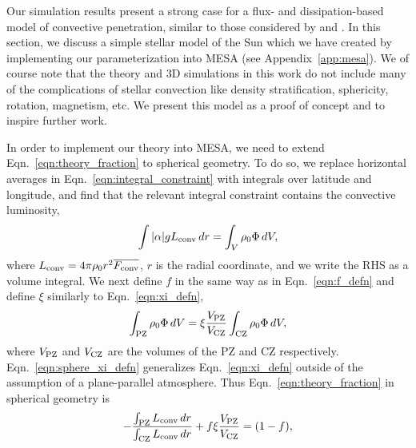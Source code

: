 \documentclass[twocolumn, linenumbers]{aastex631}
\renewcommand{\bar}[1]{\overline{#1}}
\begin{document}
Our simulation results present a strong case for a flux- and dissipation-based model of convective penetration, similar to those considered by \citet{zahn1991} and \citet{roxburgh1989}.
In this section, we discuss a simple stellar model of the Sun which we have created by implementing our parameterization into MESA (see Appendix~\ref{app:mesa}).
We of course note that the theory and 3D simulations in this work do not include many of the complications of stellar convection like density stratification, sphericity, rotation, magnetism, etc.
We present this model as a proof of concept and to inspire further work.

In order to implement our theory into MESA, we need to extend Eqn.~\ref{eqn:theory_fraction} to spherical geometry.
To do so, we replace horizontal averages in Eqn.~\ref{eqn:integral_constraint} with integrals over latitude and longitude, and find that the relevant integral constraint contains the convective luminosity,
\begin{equation}
\int |\alpha| g L_{\rm{conv}}\,dr =   \int_V \rho_0 \Phi\,dV,
\label{eqn:mesa_integral_constraint}
\end{equation}
where $L_{\rm{conv}} = 4\pi\rho_0 r^2 \bar{F_{\rm{conv}}}$, $r$ is the radial coordinate, and we write the RHS as a volume integral.
We next define $f$ in the same way as in Eqn.~\ref{eqn:f_defn} and define $\xi$ similarly to Eqn.~\ref{eqn:xi_defn},
\begin{equation}
\int_{\rm{PZ}} \rho_0 \Phi \,dV = \xi \frac{V_{\rm{PZ}}}{V_{\rm{CZ}}}\int_{\rm{CZ}}\rho_0 \Phi \, dV,
\label{eqn:sphere_xi_defn}
\end{equation}
where $V_{\rm{PZ}}$ and $V_{\rm{CZ}}$ are the volumes of the PZ and CZ respectively.
Eqn.~\ref{eqn:sphere_xi_defn} generalizes Eqn.~\ref{eqn:xi_defn} outside of the assumption of a plane-parallel atmosphere.
Thus Eqn.~\ref{eqn:theory_fraction} in spherical geometry is
\begin{equation}
-\frac{\int_{\rm{PZ}} L_{\rm{conv}}\,dr}{\int_{\rm{CZ}} L_{\rm{conv}}\,dr} + f \xi \frac{V_{\rm{PZ}}}{V_{\rm{CZ}}} = (1 - f),
\label{eqn:mesa_eqn}
\end{equation}
\end{document}
